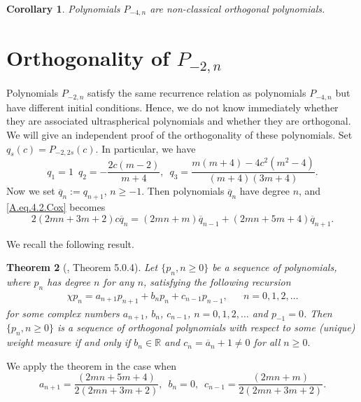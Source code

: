 \documentclass[review,nopreprintline]{elsarticle}
\newtheorem{theorem}{Theorem}[section]
\newtheorem{corollary}[theorem]{Corollary}
\theoremstyle{definition}
\numberwithin{equation}{section}
\theoremstyle{remark}
\begin{document}
	    \begin{corollary}
	        Polynomials $P_{-4,n}$ are non-classical orthogonal polynomials.
	    \end{corollary}
	    \section{Orthogonality of $P_{-2,n}$}
	    
	    Polynomials $P_{-2,n}$ satisfy the same recurrence relation as polynomials $P_{-4,n}$ but have different initial conditions. Hence, we do not know immediately whether they are associated ultraspherical polynomials and whether they are orthogonal. We will give an independent proof of the orthogonality of these polynomials.
	     Set $q_s(c)=P_{-2,2s}(c)$. In particular, we have
	   $$
	        q_{1}=1\,\,\, q_{2}=-\frac{2 c (m-2)}{m+4}, \,\,\,
	        q_{3}= \frac{m (m+4)-4 c^2 \left(m^2-4\right)}{(m+4) (3 m+4)}.
	    $$
	   Now we set
	 $  \overline{q}_n:=q_{n+1}$,  $n\geq -1$.
	    Then polynomials $\overline{q}_{n}$ have degree $n$, and  \eqref{A.eq.4.2.Cox} becomes
	    \begin{equation}
	        2  (2m n+3m+2)c \overline{q}_{n}=(2 m n+m) \overline{q}_{n-1}+(2m n+5m+4) \overline{q}_{n+1}.
	    \end{equation}
	    
	    We recall the following result.
	    \begin{theorem}[\cite{Cox2013DJKMPolynomials}, Theorem 5.0.4] \label{a.cox.5.0.4} Let $\{p_n, n \geq 0\}$ be a sequence of polynomials, where $p_n$ has degree $n$ for any $n$, satisfying the following recursion
	        \begin{align}
	            \chi p_n = a_{n+1}p_{n+1}+b_np_n+c_{n-1}p_{n-1}, && n=0,1,2,\dots
	        \end{align}
	        for some complex numbers $a_{n+1}$, $b_n$, $c_{n-1}$, $n=0, 1, 2, \dots$ and $p_{-1}=0$. Then $\{p_n, n\geq 0\}$ is a sequence of orthogonal polynomials with respect to some (unique) weight measure if and only if $b_n\in \mathbb{R}$ and $c_n=\overline{a}_n+1\neq 0$ for all $n\geq 0.$
	    \end{theorem}
	    We apply the theorem in the case when $$a_{n+1}=\frac{(2m n+5m+4) }{2  (2m n+3m+2)}, \,\,\, b_{n}=0, \,\,\, c_{n-1}=\frac{(2 m n+m)}{2  (2m n+3m+2)}.$$
	    
\end{document}

